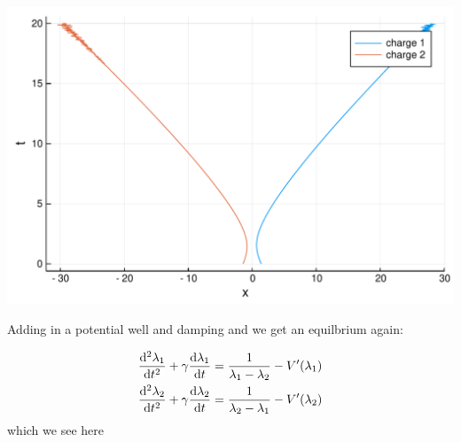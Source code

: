 \documentclass[12pt,a4paper]{article}
\def\D{ {\rm d} }
\def\dt{\D t}
\begin{document}
\includegraphics[width=\linewidth]{figures/Lecture16_2_1.pdf}

Adding in a potential well and damping and we get an equilbrium again:


\begin{align*}
{\D^2 \lambda_1 \over \D t^2} + \gamma {\D \lambda_1 \over \dt} = {1 \over \lambda_1 -\lambda_2} - V'(\lambda_1) \\
{\D^2 \lambda_2 \over \D t^2}+ \gamma {\D \lambda_2 \over \dt} = {1 \over \lambda_2 -\lambda_1} - V'(\lambda_2)
\end{align*}
which we see here
\end{document}
